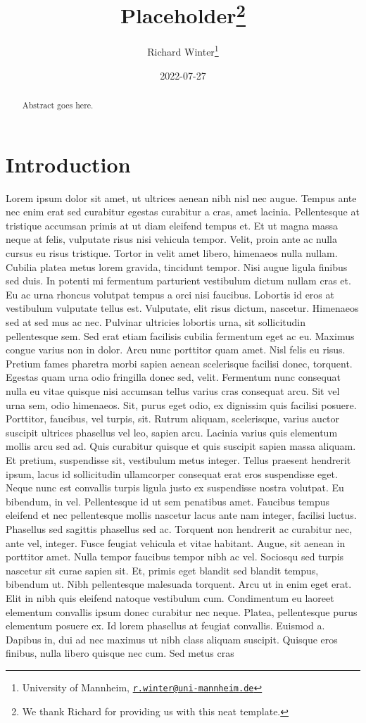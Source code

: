 \documentclass[
  12pt,
]{article}
\title{Placeholder\footnote{We thank Richard for providing us with this neat template.}}
\author{Richard Winter\footnote{University of Mannheim, \href{mailto:r.winter@uni-mannheim.de}{\nolinkurl{r.winter@uni-mannheim.de}}}}
\date{2022-07-27}
\begin{document}
\maketitle
\begin{abstract}
Abstract goes here.
\end{abstract}

\newpage

\hypertarget{intro}{%
\section{Introduction}\label{intro}}

Lorem ipsum dolor sit amet, ut ultrices aenean nibh nisl nec augue. Tempus ante nec enim erat sed curabitur egestas curabitur a cras, amet lacinia. Pellentesque at tristique accumsan primis at ut diam eleifend tempus et. Et ut magna massa neque at felis, vulputate risus nisi vehicula tempor. Velit, proin ante ac nulla cursus eu risus tristique. Tortor in velit amet libero, himenaeos nulla nullam. Cubilia platea metus lorem gravida, tincidunt tempor. Nisi augue ligula finibus sed duis. In potenti mi fermentum parturient vestibulum dictum nullam cras et. Eu ac urna rhoncus volutpat tempus a orci nisi faucibus. Lobortis id eros at vestibulum vulputate tellus est. Vulputate, elit risus dictum, nascetur. Himenaeos sed at sed mus ac nec. Pulvinar ultricies lobortis urna, sit sollicitudin pellentesque sem. Sed erat etiam facilisis cubilia fermentum eget ac eu. Maximus congue varius non in dolor. Arcu nunc porttitor quam amet. Nisl felis eu risus. Pretium fames pharetra morbi sapien aenean scelerisque facilisi donec, torquent. Egestas quam urna odio fringilla donec sed, velit. Fermentum nunc consequat nulla eu vitae quisque nisi accumsan tellus varius cras consequat arcu. Sit vel urna sem, odio himenaeos. Sit, purus eget odio, ex dignissim quis facilisi posuere. Porttitor, faucibus, vel turpis, sit. Rutrum aliquam, scelerisque, varius auctor suscipit ultrices phasellus vel leo, sapien arcu. Lacinia varius quis elementum mollis arcu sed ad. Quis curabitur quisque et quis suscipit sapien massa aliquam. Et pretium, suspendisse sit, vestibulum metus integer. Tellus praesent hendrerit ipsum, lacus id sollicitudin ullamcorper consequat erat eros suspendisse eget. Neque nunc est convallis turpis ligula justo ex suspendisse nostra volutpat. Eu bibendum, in vel. Pellentesque id ut sem penatibus amet. Faucibus tempus eleifend et nec pellentesque mollis nascetur lacus ante nam integer, facilisi luctus. Phasellus sed sagittis phasellus sed ac. Torquent non hendrerit ac curabitur nec, ante vel, integer. Fusce feugiat vehicula et vitae habitant. Augue, sit aenean in porttitor amet. Nulla tempor faucibus tempor nibh ac vel. Sociosqu sed turpis nascetur sit curae sapien sit. Et, primis eget blandit sed blandit tempus, bibendum ut. Nibh pellentesque malesuada torquent. Arcu ut in enim eget erat. Elit in nibh quis eleifend natoque vestibulum cum. Condimentum eu laoreet elementum convallis ipsum donec curabitur nec neque. Platea, pellentesque purus elementum posuere ex. Id lorem phasellus at feugiat convallis. Euismod a. Dapibus in, dui ad nec maximus ut nibh class aliquam suscipit. Quisque eros finibus, nulla libero quisque nec cum. Sed metus cras 
\end{document}
